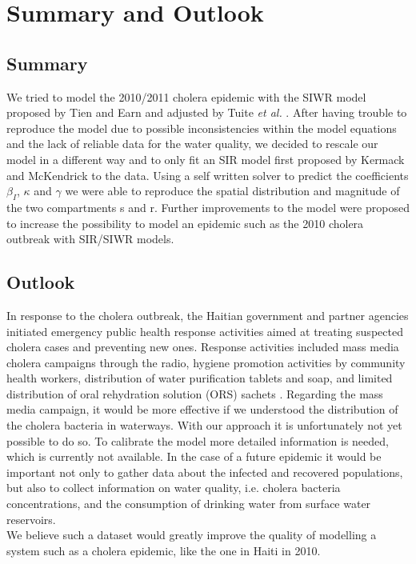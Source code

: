 \documentclass[11pt]{article}
\begin{document}
{\newpage
\section{Summary and Outlook}
\subsection{Summary}
We tried to model the 2010/2011 cholera epidemic with the SIWR model proposed by Tien and Earn \cite{tien:2010} and adjusted by Tuite \textit{et al.} \cite{tuite:2011}. After having trouble to reproduce the model due to possible inconsistencies within the model equations and the lack of reliable data for the water quality, we decided to rescale our model in a different way and to only fit an SIR model first proposed by Kermack and McKendrick \cite{kermack:1927} to the data. Using a self written solver to predict the coefficients $\beta_{I}$, $\kappa$ and $\gamma$ we were able to reproduce the spatial distribution and magnitude of the two compartments s and r. 
Further improvements to the model were proposed to increase the possibility to model an epidemic such as the 2010 cholera outbreak with SIR/SIWR models.


\subsection{Outlook}
In response to the cholera outbreak, the Haitian government and partner agencies initiated emergency public health response activities aimed at treating suspected cholera cases and preventing new ones. Response activities included mass media cholera campaigns through the radio, hygiene promotion activities by community health workers, distribution of water purification tablets and soap, and limited distribution of oral rehydration solution (ORS) sachets \cite{web:ors}. Regarding the mass media campaign, it would be more effective if we understood the distribution of the cholera bacteria in waterways. With our approach it is unfortunately not yet possible to do so. To calibrate the model more detailed information is needed, which is currently not available. In the case of a future epidemic it would be important not only to gather data about the infected and recovered populations, but also to collect information on water quality, i.e. cholera bacteria concentrations, and the consumption of drinking water from surface water reservoirs.\\
We believe such a dataset would greatly improve the quality of modelling a system such as a cholera epidemic, like the one in Haiti in 2010.
\newpage

}
\end{document}

